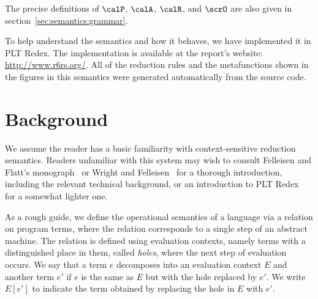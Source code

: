 The precise definitions of $\calP$, $\calA$, $\calR$, and $\scrO$ are also given in section~\ref{sec:semantics:grammar}.

To help understand the semantics and how it behaves, we have
implemented it in PLT Redex. The implementation is available at the
report's website: \url{http://www.r6rs.org/}. All of the reduction
rules and the metafunctions shown in the figures in this semantics
were generated automatically from the source code.

\section{Background}

We assume the reader has a basic familiarity with context-sensitive
reduction semantics. Readers unfamiliar with this system may wish to
consult Felleisen and Flatt's monograph~\cite{ff:monograph} or Wright
and Felleisen~\cite{wf:type-soundness} for a thorough introduction,
including the relevant technical background, or an introduction to PLT
Redex~\cite{mfff:plt-redex} for a somewhat lighter one.

As a rough guide, we define the operational semantics of a language
via a relation on program terms, where the relation corresponds to a
single step of an abstract machine. The relation is defined using
evaluation contexts, namely terms with a distinguished place in them,
called \emph{holes}, where the next step of evaluation
occurs. We say that a term $e$ decomposes into an evaluation
context $E$ and another term $e'$ if $e$ is the
same as $E$ but with the hole replaced by $e'$. We write
$E[e']$ to indicate the term obtained by replacing the hole in
$E$ with $e'$.

